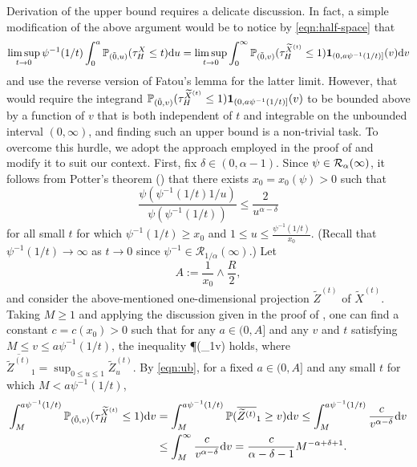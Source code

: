 \documentclass[11pt]{article}
\begin{document}
\begin{doublespace}
Derivation of the upper bound requires a delicate discussion. In fact, a simple modification of the above argument  would be to notice by \eqref{eqn:half-space} that 
\[
\limsup_{t\to 0}\psi^{-1}(1/t)\int_{0}^{a}\P_{(\tilde{0},u)}(\tau_{H}^X \leq t)\ud u
= \limsup_{t\to 0}\int_{0}^{\infty}\P_{(\tilde{0},v)}(\tau_{H}^{\widetilde{X}^{(t)}}\le 1)\mathbf{1}_{(0,a\psi^{-1}(1/t)]}(v)\ud v
\]
and use the reverse version of Fatou's lemma for the latter limit. However, that would require the integrand $\P_{(\tilde{0},v)}(\tau_{H}^{\widetilde{X}^{(t)}}\le 1)\mathbf{1}_{(0,a\psi^{-1}(1/t)]}(v)$ to be bounded above by a function of $v$ that is both independent of $t$ and integrable on the unbounded interval $(0,\infty)$, and finding such an upper bound is a non-trivial task. 
To overcome this hurdle, we adopt the approach employed in the proof of \cite[Lemma 4.5]{GPS19} and modify it to suit our context. First, fix $\delta\in(0,\alpha-1)$. Since $\psi\in \RR_{\alpha}(\infty)$, it follows from Potter's theorem (\cite[Theorem 1.5.6]{BGT}) that there exists $x_{0}=x_{0}(\psi)>0$ such that
\[
\frac{\psi(\psi^{-1}(1/t)1/u)}{\psi(\psi^{-1}(1/t))}\leq \frac{2}{u^{\alpha-\delta}}
\]
for all small $t$ for which $\psi^{-1}(1/t)\geq x_0$ and $1\leq u \leq\frac{\psi^{-1}(1/t)}{x_0}$. (Recall that $\psi^{-1}(1/t)\to \infty$ as $t\to 0$ since $\psi^{-1}\in\mathcal{R}_{1/\alpha}(\infty)$.)
Let 
\[
	A:=\frac{1}{x_0}\wedge \frac{R}{2},
\] 
and consider the above-mentioned one-dimensional projection $\widetilde{Z}^{(t)}$ of $\widetilde{X}^{(t)}$.
Taking $M\ge 1$ and applying the discussion given in the proof of \cite[Lemma 4.5]{GPS19}, one can find a constant $c=c(x_0)>0$ such that for any $a\in (0,A]$ and any $v$ and $t$ satisfying $M\leq v\leq a\psi^{-1}(1/t)$, the inequality 
\beq\label{eqn:ub}
\P(_1\geq v) \leq {}
\eeq
holds, where $\overline{\widetilde{Z}^{(t)}}_1=\sup_{0\le u\le 1}\widetilde{Z}^{(t)}_u$.
By \eqref{eqn:ub}, for a fixed $a\in (0,A]$ and any small $t$ for which $M<a\psi^{-1}(1/t)$,
\begin{align}\label{eqn:ub2}
\int_{M}^{a\psi^{-1}(1/t)}\P_{(\tilde{0},v)}(\tau_{H}^{\widetilde{X}^{(t)}}\leq  1)\ud v
&=\int_{M}^{a\psi^{-1}(1/t)}\P(\overline{\widetilde{Z}^{(t)}}_1\geq v) \ud v\notag 
\le \int_{M}^{a\psi^{-1}(1/t)}\frac{c}{v^{\alpha-\delta}}\ud v\\
&\leq \int_{M}^{\infty}\frac{c}{v^{\alpha-\delta}}\ud v
=\frac{c}{\alpha-\delta-1}M^{-\alpha+\delta+1}.
\end{align}



\end{doublespace}
\end{document}
